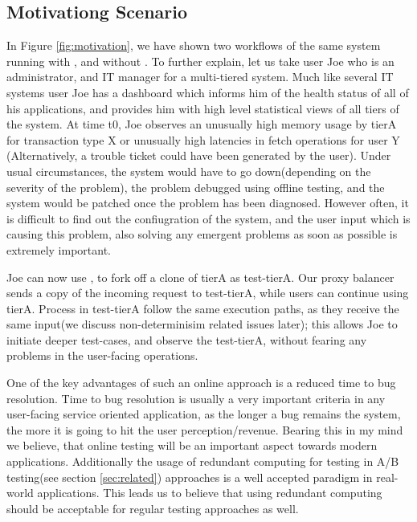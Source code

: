 


\subsection{Motivationg Scenario}
\label{sec:motivation}

In Figure \ref{fig:motivation}, we have shown two workflows of the same system running with \parikshan, and without \parikshan.
To further explain, let us take  user Joe who is an administrator, and IT manager for a multi-tiered system. 
Much like several IT systems user Joe has a dashboard which informs him of the health status of all of his applications, and provides him with high level statistical views of all tiers of the system.
At time t0, Joe observes an unusually high memory usage by tierA for transaction type X or unusually high latencies in fetch operations for user Y (Alternatively, a trouble ticket could have been generated by the user).
Under usual circumstances, the system would have to go down(depending on the severity of the problem), the problem debugged using offline testing,  and the system would be patched once the problem has been diagnosed.
However often, it is difficult to find out the confiugration of the system, and the user input which is causing this problem, also solving any emergent problems as soon as possible is extremely important.

Joe can now use \parikshan, to fork off a clone of tierA as test-tierA. 
Our proxy balancer sends a copy of the incoming request to test-tierA, while users can continue using tierA. 
Process in test-tierA follow the same execution paths, as they receive the same input(we discuss non-determinisim related issues later); 
this allows Joe to initiate deeper test-cases, and observe the test-tierA, without fearing any problems in the user-facing operations.

One of the key advantages of such an online approach is a reduced time to bug resolution.
Time to bug resolution is usually a very important criteria in any user-facing service oriented application, as the longer a bug remains the system, the more it is going to hit the user perception/revenue.
Bearing this in my mind we believe, that online testing will be an important aspect towards modern applications.
Additionally the usage of redundant computing for testing in A/B testing(see section \ref{sec:related}) approaches is a well accepted paradigm in real-world applications.
This leads us to believe that using redundant computing should be acceptable for regular testing approaches as well.

